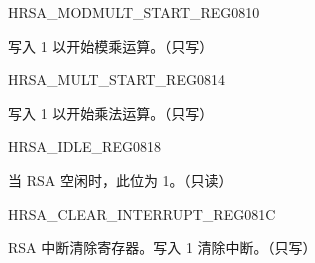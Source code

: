 \begin{register}{H}{RSA\_MODMULT\_START\_REG}{\hexprefix{}0810}\label{regdesc:RSAMODMULTSTARTREG}
%
%
\regnewline%
\begin{regdesc}\begin{reglist}
\item [RSA\_MODMULT\_START] 写入 1 以开始模乘运算。（只写）
\end{reglist}\end{regdesc}
\end{register}


\begin{register}{H}{RSA\_MULT\_START\_REG}{\hexprefix{}0814}\label{regdesc:RSAMULTSTARTREG}
%
%
\regnewline%
\begin{regdesc}\begin{reglist}
\item [RSA\_MULT\_START] 写入 1 以开始乘法运算。（只写）
\end{reglist}\end{regdesc}
\end{register}



\begin{register}{H}{RSA\_IDLE\_REG}{\hexprefix{}0818}\label{regdesc:RSAIDLEREG}
%
%
\regnewline%
\begin{regdesc}\begin{reglist}
\item [RSA\_IDLE] 当 RSA 空闲时，此位为 1。（只读）
\end{reglist}\end{regdesc}
\end{register}


\begin{register}{H}{RSA\_CLEAR\_INTERRUPT\_REG}{\hexprefix{}081C}\label{regdesc:RSACLEARINTERRUPTREG}
%
%
\regnewline%
\begin{regdesc}\begin{reglist}
\item [RSA\_CLEAR\_INTERRUPT] RSA 中断清除寄存器。写入 1 清除中断。（只写）
\end{reglist}\end{regdesc}
\end{register}



